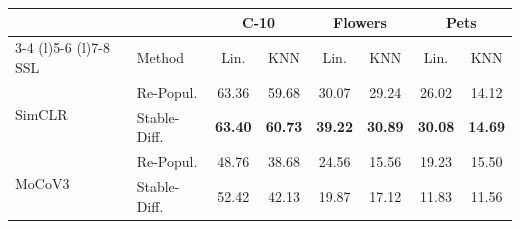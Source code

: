 
\centering
\setlength{\tabcolsep}{2pt}
\caption{\centering Sample Generation\\(ViT-B, SimCLR, ImageNet-100-LT)}
{\begin{tabular}{ll cc cc cc}
    \toprule
     && \multicolumn{2}{c}{\textbf{C-10}} &  \multicolumn{2}{c}{\textbf{Flowers}} &  \multicolumn{2}{c}{\textbf{Pets}} \\
     \cmidrule(r){3-4}
     \cmidrule(l){5-6}
     \cmidrule(l){7-8}
    SSL & Method & Lin. & KNN & Lin. & KNN & Lin. & KNN \\
    \midrule
    \multirow{2}{*}{SimCLR} & Re-Popul.     & 63.36   & 59.68  & 30.07 & 29.24 & 26.02 & 14.12 \\
    & Stable-Diff.  & \textbf{63.40} & \textbf{60.73} & \textbf{39.22} & \textbf{30.89} & \textbf{30.08} & \textbf{14.69}\\
    \midrule
    \multirow{2}{*}{MoCoV3} & Re-Popul.     & 48.76   & 38.68  & 24.56 & 15.56 & 19.23 & 15.50 \\
    & Stable-Diff.  & 52.42 & 42.13 & 19.87 & 17.12 & 11.83 & 11.56 \\
    \bottomrule
\end{tabular}
\label{table:sample_generation}}